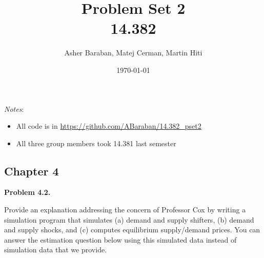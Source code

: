 \documentclass[11pt]{article}
\title{Problem Set 2 \\ 14.382}
\author{Asher Baraban, Matej Cerman, Martin Hiti}
\date{\today}
\newenvironment{problem}[1]
    {\bigskip\noindent\textbf{Problem #1.}\par\setlength{\parindent}{0pt}}
    {\medskip}
\begin{document}
\maketitle

\noindent \textit{Notes}:
\begin{itemize}
    \item All code is in \url{https://github.com/ABaraban/14.382_pset2}
    \item All three group members took 14.381 last semester
\end{itemize}

\subsection*{Chapter 4} 

\begin{problem}{4.2}
Provide an explanation addressing the concern of Professor
Cox by writing a simulation program that simulates (a) demand
and supply shifters, (b) demand and supply shocks,
and (c) computes equilibrium supply/demand prices. You
can answer the estimation question below using this simulated
data instead of simulation data that we provide.
\end{problem}
\end{document}
